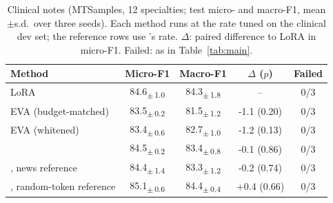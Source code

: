 \begin{table}[t]
\centering
\caption{Clinical notes (MTSamples, 12 specialties; test micro- and macro-F1, mean$\pm$s.d.\ over three seeds). Each method runs at the rate tuned on the clinical dev set; the reference rows use \method{}'s rate. $\Delta$: paired difference to LoRA in micro-F1. Failed: as in Table~\ref{tab:main}.}
\label{tab:clinical}
\footnotesize
\setlength{\tabcolsep}{2.5pt}
\begin{tabular}{lcccc}
\toprule
Method & Micro-F1 & Macro-F1 & $\Delta$ ($p$) & Failed \\
\midrule
LoRA & 84.6\textsubscript{$\pm$\,1.0} & 84.3\textsubscript{$\pm$\,1.8} & -- & 0/3 \\
EVA (budget-matched) & 83.5\textsubscript{$\pm$\,0.2} & 81.5\textsubscript{$\pm$\,1.2} & -1.1 (0.20) & 0/3 \\
EVA (whitened) & 83.4\textsubscript{$\pm$\,0.6} & 82.7\textsubscript{$\pm$\,1.0} & -1.2 (0.13) & 0/3 \\
\method{} & 84.5\textsubscript{$\pm$\,0.2} & 83.4\textsubscript{$\pm$\,0.8} & -0.1 (0.86) & 0/3 \\
\midrule
\method{}, news reference & 84.4\textsubscript{$\pm$\,1.4} & 83.3\textsubscript{$\pm$\,1.2} & -0.2 (0.74) & 0/3 \\
\method{}, random-token reference & 85.1\textsubscript{$\pm$\,0.6} & 84.4\textsubscript{$\pm$\,0.4} & +0.4 (0.66) & 0/3 \\
\bottomrule
\end{tabular}
\end{table}
